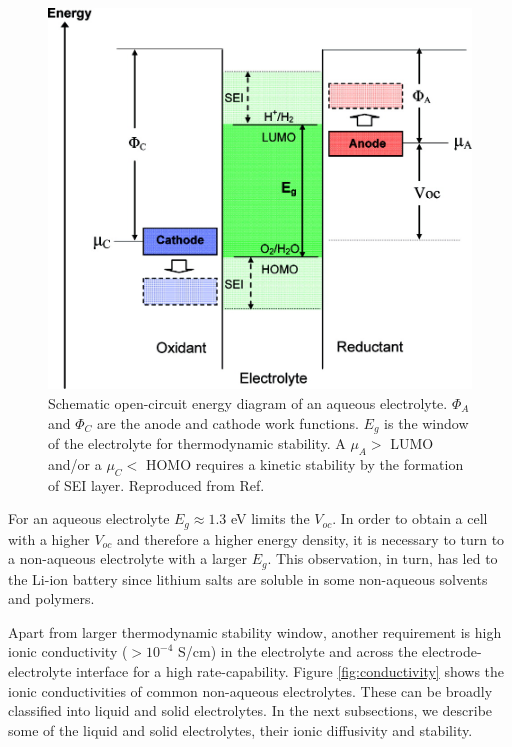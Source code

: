 \documentclass[../main.tex]{subfiles}
\begin{document}
\begin{figure}
    \centering
    \includegraphics{figures/electrolyte.jpeg}
    \caption{Schematic open-circuit energy diagram of an aqueous electrolyte. $\Phi_{A}$ and $\Phi_{C}$ are the anode and cathode work functions. $E_{g}$ is the window of the electrolyte for thermodynamic stability. A $\mu_{A}>$ LUMO and/or a $\mu_{C}<$ HOMO requires a kinetic stability by the formation of SEI layer. Reproduced from Ref.  }
    \label{fig:electrolyte}
\end{figure}


For an aqueous electrolyte $E_g \approx 1.3 $  eV  limits the $V_{oc}$. In order to obtain a cell with a higher $V_{oc}$ and therefore a higher energy density, it is necessary to turn to a non-aqueous electrolyte with a larger $E_g$. This observation, in turn, has led to the Li-ion battery since lithium salts are soluble in some non-aqueous solvents and polymers.

Apart from larger thermodynamic stability window, another requirement is high ionic conductivity ($>10^{-4}$ S/cm) in the electrolyte and across the electrode-electrolyte interface for a high rate-capability. Figure \ref{fig:conductivity} shows the ionic conductivities of common non-aqueous  electrolytes.\cite{Kamaya2011} These can be broadly classified into liquid and solid electrolytes. In the next subsections, we describe some of the liquid and solid electrolytes, their ionic diffusivity and stability. 
\end{document}
